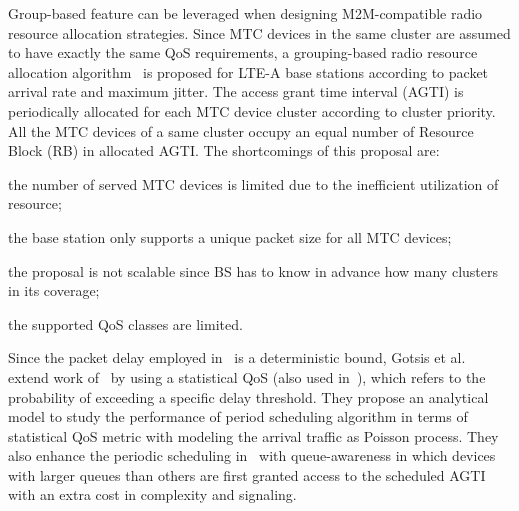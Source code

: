 Group-based feature can be leveraged when designing M2M-compatible radio resource allocation strategies. Since MTC devices in the same cluster are assumed to have exactly the same QoS requirements, a grouping-based radio resource allocation algorithm~\cite{SYLien11}\cite{LienCL11} is proposed for LTE-A base stations according to packet arrival rate and maximum jitter. The access grant time interval (AGTI) is periodically allocated for each MTC device cluster according to cluster priority. All the MTC devices of a same cluster occupy an equal number of Resource Block (RB) in allocated AGTI. The shortcomings of this proposal are:\begin{inparaenum}[i)]
	\item the number of served MTC devices is limited due to the inefficient utilization of resource;
	\item the base station only supports a unique packet size for all MTC devices;
	\item the proposal is not scalable since BS has to know in advance how many clusters in its coverage;
	\item the supported QoS classes are limited.
\end{inparaenum} 

Since the packet delay employed in~\cite{SYLien11} is a deterministic bound, Gotsis et al.~\cite{GotsisLA12} extend work of~\cite{SYLien11} by using a statistical QoS (also used in~\cite{AijazA13}), which refers to the probability of exceeding a specific delay threshold. They propose an analytical model to study the performance of period scheduling algorithm in terms of statistical QoS metric with modeling the arrival traffic as Poisson process. They also enhance the periodic scheduling in~\cite{SYLien11} with queue-awareness in which devices with larger queues than others are first granted access to the scheduled AGTI with an extra cost in complexity and signaling. 

